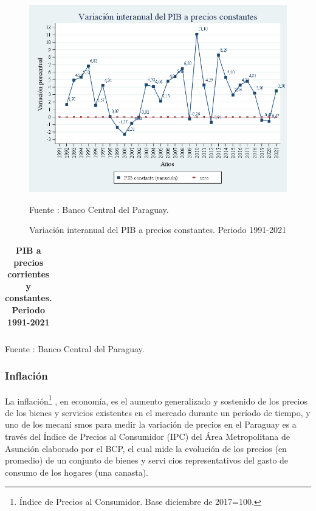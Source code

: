 \begin{figure}[H]
\begin{center}
                    \caption{Variación interanual del PIB a precios constantes. Periodo 1991-2021}
                    \includegraphics[scale=0.55]{BCP_var_pibcte.png}
                                    \item \footnotesize Fuente : Banco Central del Paraguay. 
                    \end{center}
\end{figure}

\begin{table}[H]
\begin{center}
\scriptsize
\caption{\bf{PIB a precios corrientes y constantes. Periodo 1991-2021}}
\begin{tabular}{l|rrrrrr}

\end{tabular}
                    \item \footnotesize Fuente : Banco Central del Paraguay. 
\end{center}
\end{table}

\subsubsection{Inflación}

La
inflación\footnote{Índice de Precios al Consumidor. Base diciembre de 2017=100.}
, en economía, es el aumento generalizado y sostenido de los precios de
los bienes y servicios existentes en el mercado durante un período de
tiempo, y uno de los mecani smos para medir la variación de precios en
el Paraguay es a través del Índice de Precios al Consumidor (IPC) del
Área Metropolitana de Asunción elaborado por el BCP, el cual mide la
evolución de los precios (en promedio) de un conjunto de bienes y servi
cios representativos del gasto de consumo de los hogares (una canasta).

